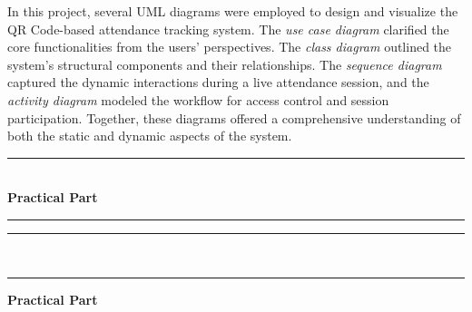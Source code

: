 \documentclass[12pt,a4paper]{report}
\begin{document}
In this project, several UML diagrams were employed to design and visualize the QR Code-based attendance tracking system. The \textit{use case diagram} clarified the core functionalities from the users’ perspectives. The \textit{class diagram} outlined the system's structural components and their relationships. The \textit{sequence diagram} captured the dynamic interactions during a live attendance session, and the \textit{activity diagram} modeled the workflow for access control and session participation. Together, these diagrams offered a comprehensive understanding of both the static and dynamic aspects of the system.



\newpage
\thispagestyle{empty}

\setcounter{chapter}{2} %

{}

\vspace*{\fill}
\begin{center}
    {\color{mintgreen} \rule{\textwidth}{2pt} }\\[0.5cm]
    {\Huge \textbf{Practical Part}}\\[0.5cm]
    {\color{mintgreen} \rule{0.8\textwidth}{1.5pt} }
\end{center}
\vspace*{\fill}

\begin{center}
    {\color{mintgreen} \rule{0.8\textwidth}{1.5pt} }\\[0.3cm]
    {\color{mintgreen} \rule{\textwidth}{2pt} }
\end{center}

\newpage

\newpage
\begin{tcolorbox}[
    colback=mintgreen!20, 
    colframe=mintgreen!80!black, 
    width=\textwidth, 
    boxrule=1pt, 
    arc=5pt, 
    auto outer arc,
    left=10pt,
    right=10pt,
    top=6pt,
    bottom=6pt
]
    \centering
    \Large \textbf{Practical Part}
\end{tcolorbox}

\vspace{0.5cm}





\newpage

\newpage
\thispagestyle{empty}
\end{document}
